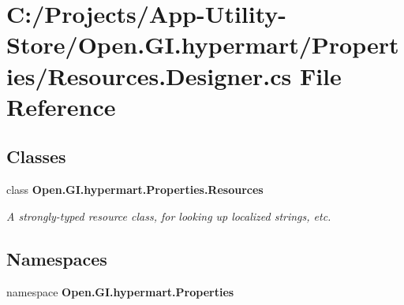 \section{C\+:/\+Projects/\+App-\/\+Utility-\/\+Store/\+Open.G\+I.\+hypermart/\+Properties/\+Resources.Designer.\+cs File Reference}
\label{_resources_8_designer_8cs}
\subsection*{Classes}
\begin{DoxyCompactItemize}
\item 
class {\bfseries Open.\+G\+I.\+hypermart.\+Properties.\+Resources}
\begin{DoxyCompactList}\small\item\em A strongly-\/typed resource class, for looking up localized strings, etc. \end{DoxyCompactList}\end{DoxyCompactItemize}
\subsection*{Namespaces}
\begin{DoxyCompactItemize}
\item 
namespace \textbf{ Open.\+G\+I.\+hypermart.\+Properties}
\end{DoxyCompactItemize}
